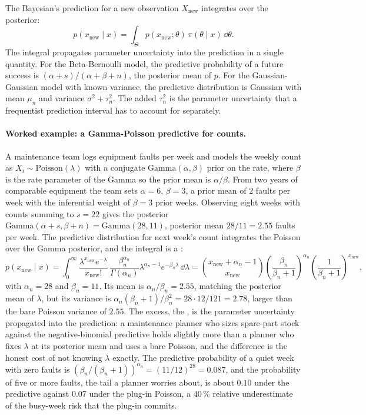 The Bayesian's prediction for a new observation $X_{\mathrm{new}}$
integrates over the posterior:
\[
p(x_{\mathrm{new}} \mid x) = \int_{\Theta} p(x_{\mathrm{new}}; \theta)\,
                                            \pi(\theta \mid x)\,\dd\theta.
\]
The integral propagates parameter uncertainty into the prediction
in a single quantity. For the Beta-Bernoulli model, the predictive
probability of a future success is $(\alpha + s)/(\alpha + \beta +
n)$, the posterior mean of $p$. For the Gaussian-Gaussian model with
known variance, the predictive distribution is Gaussian with mean
$\mu_{n}$ and variance $\sigma^{2} + \tau_{n}^{2}$. The added
$\tau_{n}^{2}$ is the parameter uncertainty that a frequentist
prediction interval has to account for separately.

\paragraph{Worked example: a Gamma-Poisson predictive for counts.}
A maintenance team logs equipment faults per week and models the
weekly count as $X_{i} \sim \mathrm{Poisson}(\lambda)$ with a
conjugate $\mathrm{Gamma}(\alpha, \beta)$ prior on the rate, where
$\beta$ is the rate parameter of the Gamma so the prior mean is
$\alpha/\beta$. From two years of comparable equipment the team sets
$\alpha = 6$, $\beta = 3$, a prior mean of $2$ faults per week with
the inferential weight of $\beta = 3$ prior weeks. Observing eight
weeks with counts summing to $s = 22$ gives the posterior
$\mathrm{Gamma}(\alpha + s, \beta + n) = \mathrm{Gamma}(28, 11)$,
posterior mean $28/11 = 2.55$ faults per week. The predictive
distribution for next week's count integrates the Poisson over the
Gamma posterior, and the integral is a :
\[
p(x_{\mathrm{new}} \mid x)
= \int_{0}^{\infty} \frac{\lambda^{x_{\mathrm{new}}}e^{-\lambda}}
{x_{\mathrm{new}}!}\, \frac{\beta_{n}^{\alpha_{n}}}{\Gamma(\alpha_{n})}
\lambda^{\alpha_{n}-1}e^{-\beta_{n}\lambda}\,\dd\lambda
= \binom{x_{\mathrm{new}} + \alpha_{n} - 1}{x_{\mathrm{new}}}
\left(\frac{\beta_{n}}{\beta_{n}+1}\right)^{\alpha_{n}}
\left(\frac{1}{\beta_{n}+1}\right)^{x_{\mathrm{new}}},
\]
with $\alpha_{n} = 28$ and $\beta_{n} = 11$. Its mean is
$\alpha_{n}/\beta_{n} = 2.55$, matching the posterior mean of
$\lambda$, but its variance is $\alpha_{n}(\beta_{n}+1)/\beta_{n}^{2}
= 28 \cdot 12/121 = 2.78$, larger than the bare Poisson variance of
$2.55$. The excess, the , is the parameter
uncertainty propagated into the prediction: a maintenance planner
who sizes spare-part stock against the negative-binomial predictive
holds slightly more than a planner who fixes $\lambda$ at its
posterior mean and uses a bare Poisson, and the difference is the
honest cost of not knowing $\lambda$ exactly. The predictive
probability of a quiet week with zero faults is
$(\beta_{n}/(\beta_{n}+1))^{\alpha_{n}} = (11/12)^{28} = 0.087$,
and the probability of five or more faults, the tail a planner
worries about, is about $0.10$ under the predictive against $0.07$
under the plug-in Poisson, a $40\,\%$ relative underestimate of the
busy-week risk that the plug-in commits.

